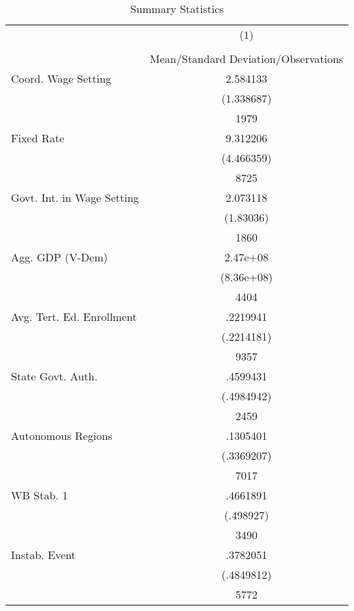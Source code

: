 {
\def\sym#1{\ifmmode^{#1}\else\(^{#1}\)\fi}
\begin{longtable}{l*{1}{c}}
\caption{Summary Statistics \label{sumstatsAll}}\\
\hline\hline\endfirsthead\hline\endhead\hline\endfoot\endlastfoot
                    &\multicolumn{1}{c}{(1)}\\
                    &\multicolumn{1}{c}{}\\
                    &Mean/Standard Deviation/Observations\\
\hline
Coord. Wage Setting &    2.584133\\
                    &  (1.338687)\\
                    &        1979\\
Fixed Rate          &    9.312206\\
                    &  (4.466359)\\
                    &        8725\\
Govt. Int. in Wage Setting&    2.073118\\
                    &   (1.83036)\\
                    &        1860\\
Agg. GDP (V-Dem)    &    2.47e+08\\
                    &  (8.36e+08)\\
                    &        4404\\
Avg. Tert. Ed. Enrollment&    .2219941\\
                    &  (.2214181)\\
                    &        9357\\
State Govt. Auth.   &    .4599431\\
                    &  (.4984942)\\
                    &        2459\\
Autonomous Regions  &    .1305401\\
                    &  (.3369207)\\
                    &        7017\\
WB Stab. 1          &    .4661891\\
                    &   (.498927)\\
                    &        3490\\
Instab. Event       &    .3782051\\
                    &  (.4849812)\\
                    &        5772\\

\end{longtable}}
